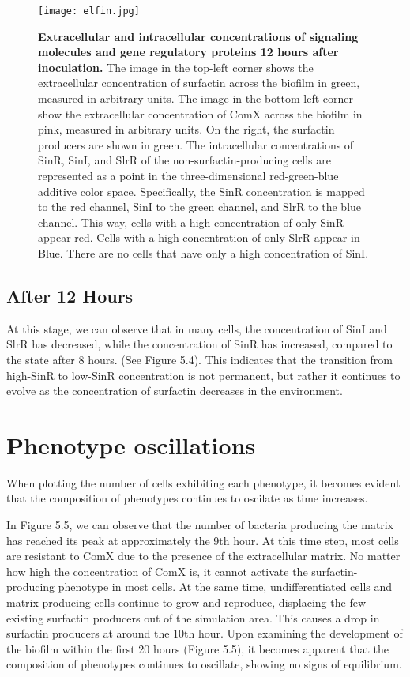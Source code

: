 \begin{figure}[h]
    \centering
    \texttt{[image: elfin.jpg]}
    \caption{\footnotesize \textbf{Extracellular and intracellular concentrations of signaling molecules and gene regulatory proteins 12 hours after inoculation.} The image in the top-left corner shows the extracellular concentration of surfactin across the biofilm in green, measured in arbitrary units. The image in the bottom left corner show the extracellular concentration of ComX across the biofilm in pink, measured in arbitrary units. On the right, the surfactin producers are shown in green. The intracellular concentrations of SinR, SinI, and SlrR of the non-surfactin-producing cells are represented as a point in the three-dimensional red-green-blue additive color space. Specifically, the SinR concentration is mapped to the red channel, SinI to the green channel, and SlrR to the blue channel. This way, cells with a high concentration of only SinR appear red. Cells with a high concentration of only SlrR appear in Blue. There are no cells that have only a high concentration of SinI.}



\end{figure}

\subsection{After 12 Hours}\label{sec:contrib3:theme1}

At this stage, we can observe that in many cells, the concentration of SinI and SlrR has decreased, while the concentration of SinR has increased, compared to the state after 8 hours. (See Figure 5.4). This indicates that the transition from high-SinR to low-SinR concentration is not permanent, but rather it continues to evolve as the concentration of surfactin decreases in the environment.


\clearpage

\section{Phenotype oscillations}
When plotting the number of cells exhibiting each phenotype, it becomes evident that the composition of phenotypes continues to oscilate as time increases.

In Figure 5.5, we can observe that the number of bacteria producing the matrix has reached its peak at approximately the 9th hour. At this time step, most cells are resistant to ComX due to the presence of the extracellular matrix. No matter how high the concentration of ComX is, it cannot activate the surfactin-producing phenotype in most cells. At the same time, undifferentiated cells and matrix-producing cells continue to grow and reproduce, displacing the few existing surfactin producers out of the simulation area. This causes a drop in surfactin producers at around the 10th hour. Upon examining the development of the biofilm within the first 20 hours (Figure 5.5), it becomes apparent that the composition of phenotypes continues to oscillate, showing no signs of equilibrium.

